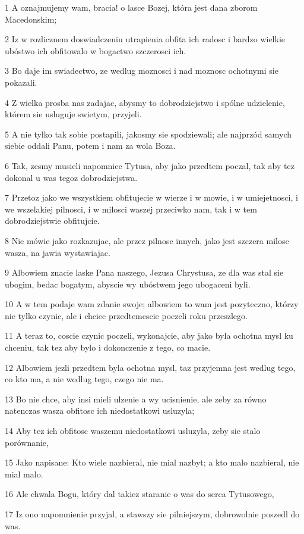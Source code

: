 \par 1 A oznajmujemy wam, bracia! o lasce Bozej, która jest dana zborom Macedonskim;
\par 2 Iz w rozlicznem doswiadczeniu utrapienia obfita ich radosc i bardzo wielkie ubóstwo ich obfitowalo w bogactwo szczerosci ich.
\par 3 Bo daje im swiadectwo, ze wedlug moznosci i nad moznosc ochotnymi sie pokazali.
\par 4 Z wielka prosba nas zadajac, abysmy to dobrodziejstwo i spólne udzielenie, którem sie usluguje swietym, przyjeli.
\par 5 A nie tylko tak sobie postapili, jakosmy sie spodziewali; ale najprzód samych siebie oddali Panu, potem i nam za wola Boza.
\par 6 Tak, zesmy musieli napomniec Tytusa, aby jako przedtem poczal, tak aby tez dokonal u was tegoz dobrodziejstwa.
\par 7 Przetoz jako we wszystkiem obfitujecie w wierze i w mowie, i w umiejetnosci, i we wszelakiej pilnosci, i w milosci waszej przeciwko nam, tak i w tem dobrodziejstwie obfitujcie.
\par 8 Nie mówie jako rozkazujac, ale przez pilnosc innych, jako jest szczera milosc wasza, na jawia wystawiajac.
\par 9 Albowiem znacie laske Pana naszego, Jezusa Chrystusa, ze dla was stal sie ubogim, bedac bogatym, abyscie wy ubóstwem jego ubogaceni byli.
\par 10 A w tem podaje wam zdanie swoje; albowiem to wam jest pozyteczno, którzy nie tylko czynic, ale i chciec przedtemescie poczeli roku przeszlego.
\par 11 A teraz to, coscie czynic poczeli, wykonajcie, aby jako byla ochotna mysl ku chceniu, tak tez aby bylo i dokonczenie z tego, co macie.
\par 12 Albowiem jezli przedtem byla ochotna mysl, taz przyjemna jest wedlug tego, co kto ma, a nie wedlug tego, czego nie ma.
\par 13 Bo nie chce, aby insi mieli ulzenie a wy ucisnienie, ale zeby za równo natenczas wasza obfitosc ich niedostatkowi usluzyla;
\par 14 Aby tez ich obfitosc waszemu niedostatkowi usluzyla, zeby sie stalo porównanie,
\par 15 Jako napisane: Kto wiele nazbieral, nie mial nazbyt; a kto malo nazbieral, nie mial malo.
\par 16 Ale chwala Bogu, który dal takiez staranie o was do serca Tytusowego,
\par 17 Iz ono napomnienie przyjal, a stawszy sie pilniejszym, dobrowolnie poszedl do was.
